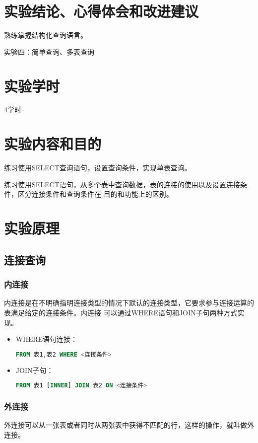 \documentclass[a4paper]{uestcreport}
\begin{document}
\section{实验结论、心得体会和改进建议}
熟练掌握结构化查询语言。

\newpage
\begin{center}
    \Large
    实验四：简单查询、多表查询
\end{center}

\setcounter{section}{0}
\section{实验学时}
4学时

\section{实验内容和目的}
练习使用SELECT查询语句，设置查询条件，实现单表查询。

练习使用SELECT语句，从多个表中查询数据，表的连接的使用以及设置连接条件，区分连接条件和查询条件在
目的和功能上的区别。

\section{实验原理}
\subsection{连接查询}
\subsubsection{内连接}
内连接是在不明确指明连接类型的情况下默认的连接类型，它要求参与连接运算的表满足给定的连接条件。内连接
可以通过WHERE语句和JOIN子句两种方式实现。
\begin{itemize}
    \item WHERE语句连接：
          \begin{lstlisting}[language=SQL]
        FROM 表1,表2 WHERE <连接条件>
    \end{lstlisting}
    \item JOIN子句：
          \begin{lstlisting}[language=SQL]
        FROM 表1 [INNER] JOIN 表2 ON <连接条件>
    \end{lstlisting}
\end{itemize}

\subsubsection{外连接}
外连接可以从一张表或者同时从两张表中获得不匹配的行，这样的操作，就叫做外连接。
\end{document}
